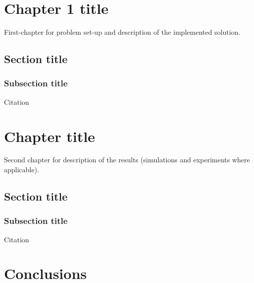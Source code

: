 \documentclass[a4paper,11pt,oneside]{book}
\begin{document}
\chapter{Chapter 1 title}
First-chapter for problem set-up and description of the implemented solution. 

\section{Section title}
\subsection {Subsection title}

Citation \cite{MR-GB:11}


\chapter{Chapter title}
Second chapter for description of the results (simulations and experiments where
applicable).
\section{Section title}
\subsection {Subsection title}

Citation \cite{MR-GB:11}



\chapter*{Conclusions} %


{}

\end{document}
